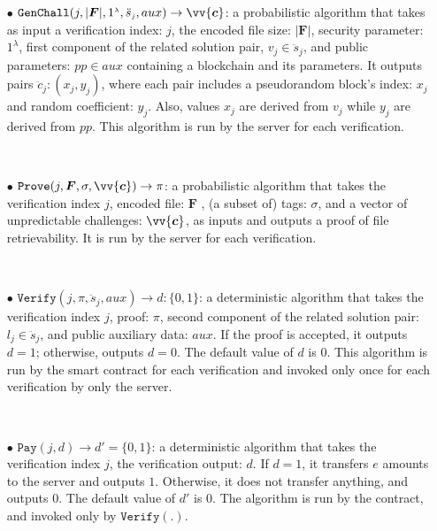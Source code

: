 \begin{definition}
\begin{itemize}
\item[$\bullet$] $\mathtt{GenChall}(j,|{\bm{F}}|, 1^{\scriptscriptstyle\lambda},\ddot{s}_{\scriptscriptstyle j},aux)\rightarrow \vv{\bm{c}}$: a probabilistic algorithm that takes as input a verification index: $j$, the encoded file size: $|{\bm{F}}|$, security parameter: $1^{\scriptscriptstyle\lambda}$, first component of the related solution pair, $v_{\scriptscriptstyle j}\in \ddot{s}_{\scriptscriptstyle j}$, and public parameters: $pp\in aux$ containing  a blockchain and its parameters. It outputs pairs $\ddot{c}_{\scriptscriptstyle j} : (x_{\scriptscriptstyle j} , y_{\scriptscriptstyle j} )$, where each pair includes a pseudorandom  block's index:  $x_{\scriptscriptstyle j}$ and random coefficient: $y_{\scriptscriptstyle j}$. Also, values $x_{\scriptscriptstyle j}$ are derived from $v_{\scriptscriptstyle j}$ while $y_{\scriptscriptstyle j}$ are derived from $pp$. This algorithm is run by the server for each verification. 



\

\item[$\bullet$] $\mathtt{Prove}(j,{\bm{F}}, \sigma,  \vv{\bm{c}})\rightarrow \pi$: a probabilistic algorithm that takes the verification index $j$, encoded file: ${\bm{F}}$ , (a subset of) tags: $\sigma$, and a vector of unpredictable challenges: $\vv{\bm{c}}$, as inputs and outputs a proof of  file retrievability. It is run by the server for each verification.

\

\item[$\bullet$] $\mathtt{Verify}(j,\pi,\ddot{s}_{\scriptscriptstyle j},aux)\rightarrow d:\{0,1\}$: a deterministic algorithm that takes the verification index $j$, proof: $\pi$,  second component of the related solution pair: $l_{\scriptscriptstyle j}\in \ddot{s}_{\scriptscriptstyle j}$, and public auxiliary data: $aux$.  If the proof is accepted, it outputs $d=1$; otherwise, outputs $d=0$. The default value of $d$ is $0$. This algorithm is run by the smart contract for each verification and invoked only once for each verification by only the server. 

\

\item[$\bullet$] $\mathtt{Pay}(j,d)\rightarrow d'=\{0,1\}$: a deterministic algorithm that takes the verification index $j$, the verification output: $d$. If $d=1$, it transfers $e$ amounts to the server and outputs $1$. Otherwise, it does not transfer anything, and outputs $0$. The default value of $d'$ is $0$. The algorithm is run by the  contract, and  invoked only by $\mathtt{Verify}(.)$. 
\end{itemize}
\end{definition}





